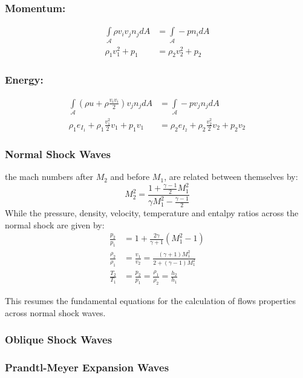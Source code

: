 \subsubsection*{Momentum:}
\begin{align}
    \int\limits_{\mathcal{A}} \rho v_i v_j n_j dA &= \int\limits_{\mathcal{A}} - p n_i dA \\
    \rho_1 v^2_1 + p_1&=  \rho_2 v^2_2 + p_2
\end{align}

\subsubsection*{Energy:}
\begin{align}
    \int\limits_{\mathcal{A}} (\rho u + \rho\frac{v_i v_i}{2}) v_j n_j dA &= \int\limits_{\mathcal{A}} - p v_j n_j dA \\
    \rho_1 e_{I_1} + \rho_1\frac{v^2_1 }{2} v_1  + p_1 v_1 &= \rho_2 e_{I_2} + \rho_2\frac{v^2_2 }{2} v_2 +  p_2 v_2
\end{align}

\subsubsection{Normal Shock Waves}
the mach numbers after $M_2$ and before $M_1$, are related between themselves by:
\begin{equation}
    M_2^2=\frac{1+ \frac{\gamma -1}{2}M_1^2}{\gamma M_1^2 - \frac{\gamma -1}{2}}
\end{equation}
While the pressure, density, velocity, temperature and entalpy ratios across the normal shock are given by:
\begin{align}
    \frac{p_2}{p_1} &= 1+\frac{2\gamma}{\gamma +1} \left(M_1^2-1 \right)\\
    \frac{\rho_2}{\rho_1} &= \frac{v_1}{v_2}=\frac{\left(\gamma+1 \right) M_1^2}{2+\left(\gamma -1 \right) M_1^2}\\
    \frac{T_2}{T_1} &= \frac{p_2}{p_1}=\frac{\rho_1}{\rho_2}=\frac{h_2}{h_1}
\end{align}

This resumes the fundamental equations for the calculation of flows properties across normal shock waves.
\subsubsection{Oblique Shock Waves}


\subsubsection{Prandtl-Meyer Expansion Waves}

